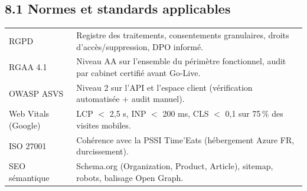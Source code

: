 \documentclass[11pt,a4paper,oneside]{report}
\begin{document}
\subsection*{8.1 Normes et standards applicables}
\renewcommand{\arraystretch}{1.3}
\begin{tabularx}{\textwidth}{L{3.5cm} Y}
\toprule
{} &  \\
\midrule
RGPD               & Registre des traitements, consentements granulaires, droits d'accès/suppression, DPO informé. \\
RGAA 4.1           & Niveau AA sur l'ensemble du périmètre fonctionnel, audit par cabinet certifié avant Go-Live. \\
OWASP ASVS         & Niveau 2 sur l'API et l'espace client (vérification automatisée + audit manuel). \\
Web Vitals (Google) & LCP $<$ 2{,}5 s, INP $<$ 200 ms, CLS $<$ 0{,}1 sur 75\,\% des visites mobiles. \\
ISO 27001          & Cohérence avec la PSSI Time'Eats (hébergement Azure FR, durcissement). \\
SEO sémantique     & Schema.org (Organization, Product, Article), sitemap, robots, balisage Open Graph. \\
\bottomrule
\end{tabularx}
\end{document}
